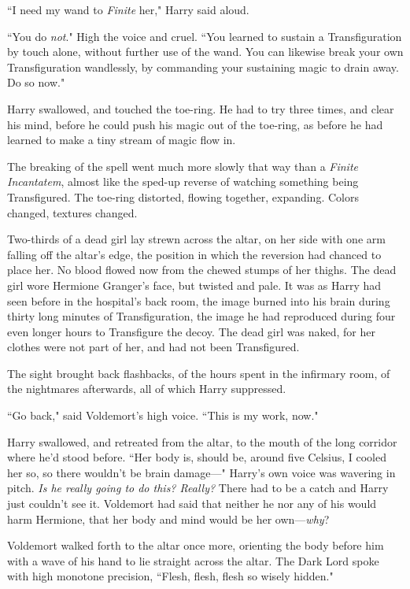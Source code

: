 ``I need my wand to \emph{Finite} her," Harry said aloud.

``You do \emph{not}." High the voice and cruel. ``You learned to sustain a Transfiguration by touch alone, without further use of the wand. You can likewise break your own Transfiguration wandlessly, by commanding your sustaining magic to drain away. Do so now."

Harry swallowed, and touched the toe-ring. He had to try three times, and clear his mind, before he could push his magic out of the toe-ring, as before he had learned to make a tiny stream of magic flow in.

The breaking of the spell went much more slowly that way than a \emph{Finite Incantatem}, almost like the sped-up reverse of watching something being Transfigured. The toe-ring distorted, flowing together, expanding. Colors changed, textures changed.

Two-thirds of a dead girl lay strewn across the altar, on her side with one arm falling off the altar's edge, the position in which the reversion had chanced to place her. No blood flowed now from the chewed stumps of her thighs. The dead girl wore Hermione Granger's face, but twisted and pale. It was as Harry had seen before in the hospital's back room, the image burned into his brain during thirty long minutes of Transfiguration, the image he had reproduced during four even longer hours to Transfigure the decoy. The dead girl was naked, for her clothes were not part of her, and had not been Transfigured.

The sight brought back flashbacks, of the hours spent in the infirmary room, of the nightmares afterwards, all of which Harry suppressed.

``Go back," said Voldemort's high voice. ``This is my work, now."

Harry swallowed, and retreated from the altar, to the mouth of the long corridor where he'd stood before. ``Her body is, should be, around five Celsius, I cooled her so, so there wouldn't be brain damage—" Harry's own voice was wavering in pitch. \emph{Is he really going to do this? Really?} There had to be a catch and Harry just couldn't see it. Voldemort had said that neither he nor any of his would harm Hermione, that her body and mind would be her own—\emph{why}?

Voldemort walked forth to the altar once more, orienting the body before him with a wave of his hand to lie straight across the altar. The Dark Lord spoke with high monotone precision, ``Flesh, flesh, flesh so wisely hidden."

